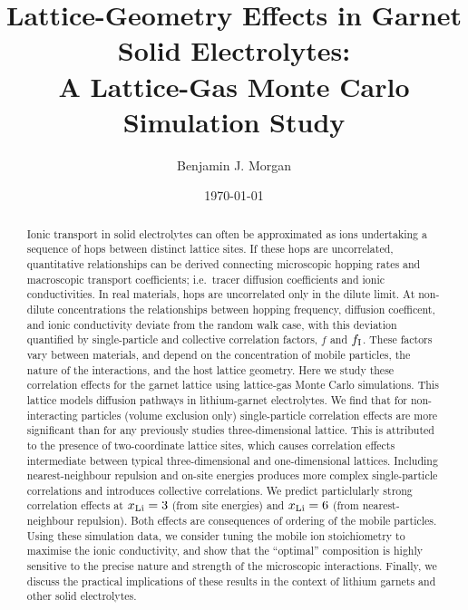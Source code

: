 \documentclass[aps,prb,twocolumn,superscriptaddress,reprint]{revtex4-1}
\newcommand{\xLi}{x_\m{Li}}
\begin{document}
\title{Lattice-Geometry Effects in Garnet Solid Electrolytes:\\ A Lattice-Gas Monte Carlo Simulation Study}
\author{Benjamin J. Morgan}

\date{\today}

\begin{abstract}
Ionic transport in solid electrolytes can often be approximated as ions undertaking a sequence of hops between distinct lattice sites. If these hops are uncorrelated, quantitative relationships can be derived connecting microscopic hopping rates and macroscopic transport coefficients; i.e.\ tracer diffusion coefficients and ionic conductivities. In real materials, hops are uncorrelated only in the dilute limit. At non-dilute concentrations the relationships between hopping frequency, diffusion coefficent, and ionic conductivity deviate from the random walk case, with this deviation quantified by single-particle and collective correlation factors, $f$ and $f_{\mathrm{I}}$. These factors vary between materials, and depend on the concentration of mobile particles, the nature of the interactions, and the host lattice geometry. 
Here we study these correlation effects for the garnet lattice using lattice-gas Monte Carlo simulations. This lattice models diffusion pathways in lithium-garnet electrolytes. We find that for non-interacting particles (volume exclusion only) single-particle correlation effects are more significant than for any previously studies three-dimensional lattice. This is attributed to the presence of two-coordinate lattice sites, which causes correlation effects intermediate between typical three-dimensional and one-dimensional lattices. Including nearest-neighbour repulsion and on-site energies produces more complex single-particle correlations and introduces collective correlations. We predict particlularly strong correlation effects at $\xLi=3$ (from site energies) and $\xLi=6$ (from nearest-neighbour repulsion). Both effects are consequences of ordering of the mobile particles. Using these simulation data, we consider tuning the mobile ion stoichiometry to maximise the ionic conductivity, and show that the ``optimal'' composition is highly sensitive to the precise nature and strength of the microscopic interactions.
Finally, we discuss the practical implications of these results in the context of lithium garnets and other solid electrolytes.
\end{abstract}
\end{document}
